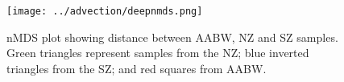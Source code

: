 \begin{figure}
  \centering
  \texttt{[image: ../advection/deepnmds.png]}
  \caption[\ac{nMDS} of \ac{AABW}, \ac{NZ} and \ac{SZ} samples]{\ac{nMDS} plot showing distance between \ac{AABW}, \ac{NZ} and \ac{SZ} samples.
  Green triangles represent samples from the \ac{NZ}; blue inverted triangles from the \ac{SZ}; and red squares from \ac{AABW}.}
  \label{fig:deepnmds}
\end{figure}
